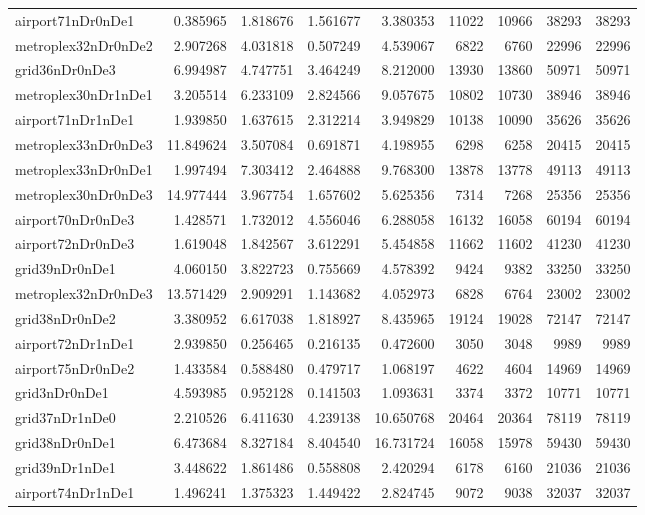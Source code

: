 \begin{longtable}{|l|r|r|r|r|r|r|r|r|}
airport71nDr0nDe1 & 0.385965 & 1.818676 & 1.561677 & 3.380353 & 11022 & 10966 & 38293 & 38293 \\
metroplex32nDr0nDe2 & 2.907268 & 4.031818 & 0.507249 & 4.539067 & 6822 & 6760 & 22996 & 22996 \\
grid36nDr0nDe3 & 6.994987 & 4.747751 & 3.464249 & 8.212000 & 13930 & 13860 & 50971 & 50971 \\
metroplex30nDr1nDe1 & 3.205514 & 6.233109 & 2.824566 & 9.057675 & 10802 & 10730 & 38946 & 38946 \\
airport71nDr1nDe1 & 1.939850 & 1.637615 & 2.312214 & 3.949829 & 10138 & 10090 & 35626 & 35626 \\
metroplex33nDr0nDe3 & 11.849624 & 3.507084 & 0.691871 & 4.198955 & 6298 & 6258 & 20415 & 20415 \\
metroplex33nDr0nDe1 & 1.997494 & 7.303412 & 2.464888 & 9.768300 & 13878 & 13778 & 49113 & 49113 \\
metroplex30nDr0nDe3 & 14.977444 & 3.967754 & 1.657602 & 5.625356 & 7314 & 7268 & 25356 & 25356 \\
airport70nDr0nDe3 & 1.428571 & 1.732012 & 4.556046 & 6.288058 & 16132 & 16058 & 60194 & 60194 \\
airport72nDr0nDe3 & 1.619048 & 1.842567 & 3.612291 & 5.454858 & 11662 & 11602 & 41230 & 41230 \\
grid39nDr0nDe1 & 4.060150 & 3.822723 & 0.755669 & 4.578392 & 9424 & 9382 & 33250 & 33250 \\
metroplex32nDr0nDe3 & 13.571429 & 2.909291 & 1.143682 & 4.052973 & 6828 & 6764 & 23002 & 23002 \\
grid38nDr0nDe2 & 3.380952 & 6.617038 & 1.818927 & 8.435965 & 19124 & 19028 & 72147 & 72147 \\
airport72nDr1nDe1 & 2.939850 & 0.256465 & 0.216135 & 0.472600 & 3050 & 3048 & 9989 & 9989 \\
airport75nDr0nDe2 & 1.433584 & 0.588480 & 0.479717 & 1.068197 & 4622 & 4604 & 14969 & 14969 \\
grid3nDr0nDe1 & 4.593985 & 0.952128 & 0.141503 & 1.093631 & 3374 & 3372 & 10771 & 10771 \\
grid37nDr1nDe0 & 2.210526 & 6.411630 & 4.239138 & 10.650768 & 20464 & 20364 & 78119 & 78119 \\
grid38nDr0nDe1 & 6.473684 & 8.327184 & 8.404540 & 16.731724 & 16058 & 15978 & 59430 & 59430 \\
grid39nDr1nDe1 & 3.448622 & 1.861486 & 0.558808 & 2.420294 & 6178 & 6160 & 21036 & 21036 \\
airport74nDr1nDe1 & 1.496241 & 1.375323 & 1.449422 & 2.824745 & 9072 & 9038 & 32037 & 32037 \\

\end{longtable}
